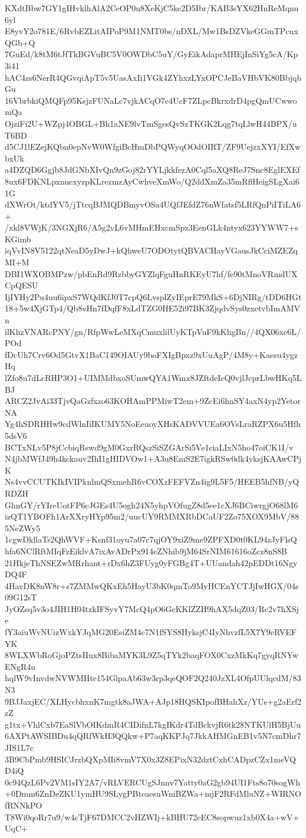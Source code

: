 KXdtBbw7GY1gIHvklhAlA2CeOP0u8XeKjC5ke2D5Ibr/KAB3sYX62HnReMqnu6yl
E8yvY2o781E/6RvbEZLitAIPoP9M1NMT0bs/nDXL/Mw1BsDZVkeGGmTPcuxQGb+Q
7GuEd/k8tM6tJfTkBGVuBC5V0OWDbC5uY/GyEikAdaprMHEjInSiYg5cA/Kp3i41
hAC4zs6NerR4QGvqiApT5v5UasAxIi1VGk4ZYhxzLYxOPCJeBaVHbVK80BbjqbGu
16VbrbkiQMQFp95KsjzFUNaLc7vjkACqO7e4UcF7ZLpcBkrxdrD4pgQmUCwwomQa
OjziFi2U+WZpj4OBGL+Bh1aNE9lvTmSgesQvSzTKGK2Lqg7tqLlwH44BPX/uT6BD
d5CJ1lEZejKQbn0epNvW0WfgiBcHmDbPQWyqOOdOIRT/ZF9UejzxXYI/EfXwbxUk
a4DZQD6Ggjb8JdGNbXIvQn9zGoj82rYYLjkkfezA0Cql5aXQ8ReJ7Snc8EglEXEf
8ux6FDKNLpxnuexyzpKLrezmzAyCwhveXmWo/Q2ddXmZa35mRflHeigSLgXai61G
dXWrOt/ktdYV5/jTtcqBJMQDBmyvOSa4UQfJEfdZ76nWfatsf5LRfQnPiITiLA6+
/xkl8VWjK/3NGXjR6/A5g2vL6vMHmEHxcmSpz3EenGLk4ntyx623YYWW7+sKGimb
iqVvIN8V5122qtNeaD5yDwJ+kQhweU7ODOtytQBVACHayVGausJkCciMZEZqMI+M
DBI1WXOBMPzw/pbEnRd9RzbbyGYZlqFguHnRKEyU7hf/fe90tMnoVRmdUXCpQESU
IjIYHy2Pu4uu6ipxS7WQdKfJ0T7cpQ6LvsplZyIEprE79MkS+6DjNIRg/tDD6HGt
18+5w4XjGTp4/Qb8vHn7fDqfF8xLdTZG0HE52i97BK3ZjqdvSys0zxetvbImAMVn
ilKhzVNARcPNY/gn/RfpWwLeMXqCmuxlilUyKTpVuF9kKhgBn//4QX06xe6L/POd
fDcUh7Crv6Od5GtvX1BaC149OIAUy9boFXIgBpxz9xUuAgP/4M8y+Kaesu4ygzHq
lZfo8u7dLcRHP3O1+UIMMdbxoSUmwQYA1Wmx8JZftdeIcQ0vjlJcprLbwHKq5LBJ
ARCZ2JvAi33TjvQaGzfxzo63KOHAmPPMiwT2em+9ZcEi6hnSY4axN4yp2YetorNA
Yg4hSDRHHw9cdWlnIiIKUMY5NoEeuoyXHsKADVVUEa6OVsLraRZPX6u5Hfh5dsV6
BCTxNLv5P8jCcbiqRswd9gM0GxrRQszSiSZGArSi5Ve1ciaLIxN5ho47oiCK1I/v
N4jbMWfJ49h4kckauv2IhI1gHIDVOw1+A3u8EmS2E7igkRSw0dk4yksjKAAwCPjK
Ns4vvCCUTKIkIVIPknlmQSxmehR6vCOXzFEFVZn4ig9L5F5/HEEB5hfNB/yQRDZH
GhnGY/rYIreUotFP6cJGEs4U5ogh24N5yhpVOfugZ8d5ee1cXJ6BCiwrgjO68lM6
izQT1YBOFh1ArXXryHYp95m2/uucUY9RMMXRbDCaUF2Zo75XOX9MbV/885NeZWy5
1cgwDkllaTs2QhWVF+Ksnf31oyu7a07c7qjOY9xiZ9me9ZPFXD0t0KL94zJyFlsQ
hfa6NClRftMIqFzEiklvA7ixAvADrPx914eZNhib9jM64SrNIM61616oZcz8nS8B
21HkjeThNSEZwMRrhant+rDx6hZ3FUyg0yFGBg4T+UUandah42pEDDt16NgyDQ4F
4HavDK8nW8r+s7ZMMwQKxEh5HayU3bK0qmTo9MyHCEnYCTJjIwHGX/04s09G12sT
JyOZsq5v3o4JIH1H04tzkIFSyvY7McQ4pO6GcKKlZZH9hAX5dqZ03/Rc2v7hXSje
fY3aiuWvNUizWxkYJqMG20EsiZM4c7N1fSYS8HyksjC4IyNhvzfL5X7Y9eRVEFYK
8WLXWbRoGjoPZtsHux8BibaMYK3L9Z5qTYk2baqFOX0CxzMkKq7gyqRNYwENgR4u
hqlW9vInvdwNVWMHte154GlpaAb63w3rp3qeQOF2Q240JzXL4OfpUUlqcdM/83N3
9BJJaxjEC/XLHycbhxnK7mgtk8aJWA+AJp18HQSKIpofBHahXz/YUs+g2aErf2zZ
g1tx+VhlCxb7EaSlVbOIKdmR4CIDifnL7kgIKdr4TdBckvjR6tk28NTKUlH5BjUu
6AXPtAWSIBDu4qQRfWkH3QQkw+P7aqKKPJq7JkkAHMGnEB1v5N7cmDhr7JIS1L7c
3B9CbPmb9HSICJrzbQXpMIi8vmV7X0x3Z8EPixN32dztCxhCADpzCZx1meVQD4iQ
0c94QzL6Pv2VM1sIY2A7/vRLVERCUgSJnnv7Yatty0aG2gb94UI1Fts8o70sogWh
+0Dmm6ZnDeZKU1ymHU9SLygPBteaesuWniBZWa+mjF2RFdMluNZ+WIRNOfRNNkPO
T8Wi0qoRr7u9/w4cTjF67DMCC2vHZWIj+kBHU72cEC8sopwuz1xb0X4a+wV+UqC+
